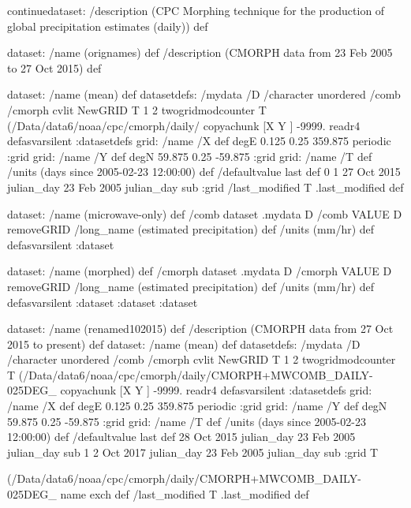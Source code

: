\begin{ingrid}
continuedataset:
  /description (CPC Morphing technique for the production of global precipitation estimates (daily)) def

  dataset:
    /name (orignames) def
    /description (CMORPH data from 23 Feb 2005 to 27 Oct 2015) def  

    dataset:
      /name (mean) def
      datasetdefs:
        /mydata {
          /D
          /character unordered 
          { /comb /cmorph } cvlit
          NewGRID
          T 1 2 twogridmodcounter
          T (/Data/data6/noaa/cpc/cmorph/daily/%
          copyachunk
          [X Y ] -9999. readr4
        }defasvarsilent
      :datasetdefs
      grid:
        /name /X def
        degE
        0.125 0.25 359.875 
        periodic
      :grid
      grid:
        /name /Y def
        degN
        59.875 0.25 -59.875
      :grid
      grid:
        /name /T def
        /units (days since 2005-02-23 12:00:00) def
        /defaultvalue {last} def
        0 1
        27 Oct 2015 julian_day %
        23 Feb 2005 julian_day sub
      :grid
      /last_modified T .last_modified def

      dataset:
        /name (microwave-only) def
        /comb {
          dataset .mydata
          D /comb VALUE D removeGRID
          /long_name (estimated precipitation) def
          /units (mm/hr) def
        } defasvarsilent
      :dataset

      dataset:
        /name (morphed) def
        /cmorph {
          dataset .mydata
          D /cmorph VALUE D removeGRID
          /long_name (estimated precipitation) def
          /units (mm/hr) def
        } defasvarsilent
      :dataset
    :dataset
  :dataset

  dataset:
    /name (renamed102015) def
    /description (CMORPH data from 27 Oct 2015 to present) def  
    dataset:
      /name (mean) def
      datasetdefs:
        /mydata {
          /D
          /character unordered 
          { /comb /cmorph } cvlit
          NewGRID
          T 1 2 twogridmodcounter
          T (/Data/data6/noaa/cpc/cmorph/daily/CMORPH+MWCOMB_DAILY-025DEG_%
          copyachunk
          [X Y ] -9999. readr4
        } defasvarsilent
      :datasetdefs
      grid:
        /name /X def
        degE
        0.125 0.25 359.875 
        periodic
      :grid
      grid:
        /name /Y def
        degN
        59.875 0.25 -59.875
      :grid
      grid:
        /name /T def
        /units (days since 2005-02-23 12:00:00) def
        /defaultvalue {last} def
        28 Oct 2015 julian_day 23 Feb 2005 julian_day sub 1
        2 Oct 2017 julian_day
        23 Feb 2005 julian_day sub
      :grid
      T { (/Data/data6/noaa/cpc/cmorph/daily/CMORPH+MWCOMB_DAILY-025DEG_%
      name exch def
      /last_modified T .last_modified def

}
\end{ingrid}
